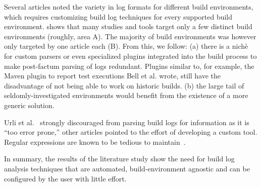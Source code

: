 Several articles noted the variety in log formats for different build
environments, which requires customizing build log techniques for
every supported build environment.
 shows that many studies and tools target
only a few distinct build environments (roughly, area A).
The majority of build environments was however only targeted by one
article each (B).
From this, we follow: (a) there is a nichè for custom parsers or even
specialized plugins integrated into the build process to make
post-factum
parsing of logs redundant.
Plugins  similar to, for example, the Maven plugin to report test
executions Bell et al.
wrote, still have the disadvantage of not being able to work on historic
builds.
(b) the large tail of seldomly-investigated environments would benefit
from the existence of a more generic
solution.

Urli et al.~\cite{urli2018design} strongly discouraged from parsing
build logs for information as it is ``too error prone,'' other
articles pointed to the effort of developing a custom tool.
Regular expressions are known to be tedious to
maintain~\cite{michael2019regexes}.


In summary, the results of the literature study show the need for
build log
analysis techniques that are automated, build-environment agnostic
and can be configured by the user with little effort.


